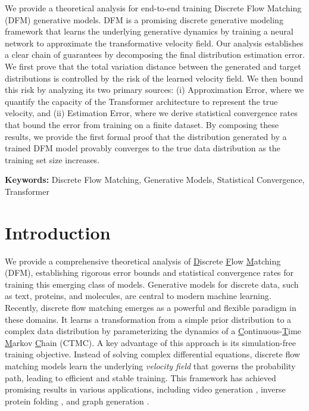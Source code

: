\documentclass[12pt]{article}
\numberwithin{equation}{section}
\let\cite\citep
\theoremstyle{theoremstyle}
\numberwithin{equation}{section}
\numberwithin{theorem}{section}
\numberwithin{proposition}{section}
\numberwithin{definition}{section}
\numberwithin{lemma}{section}
\numberwithin{assumption}{section}
\numberwithin{remark}{section}
\begin{document}
\begin{titlepage}
\noindent
We provide a theoretical analysis for end-to-end training Discrete Flow Matching (DFM) generative models. 
DFM is a promising discrete generative modeling framework that learns the underlying generative dynamics by training a neural network to approximate the transformative velocity field. 
Our analysis establishes a clear chain of guarantees by decomposing the final distribution estimation error.
We first prove that the total variation distance between the generated and target distributions is controlled by the risk of the learned velocity field. 
We then bound this risk by analyzing its two primary sources: (i) Approximation Error, where we quantify the capacity of the Transformer architecture to represent the true velocity, and (ii) Estimation Error, where we derive statistical convergence rates that bound the error from training on a finite dataset. 
By composing these results, we provide the first formal proof that the distribution generated by a trained DFM model provably converges to the true data distribution as the training set size increases. 

\vfill

\textbf{Keywords:}
Discrete Flow Matching, Generative Models, Statistical Convergence, Transformer




\end{titlepage}



{
\setlength{\parskip}{0em}
\setcounter{tocdepth}{2}
\tableofcontents
}
\setcounter{footnote}{0}


\section{Introduction}
\label{sec:intro}

We provide a comprehensive theoretical analysis of \underline{D}iscrete \underline{F}low \underline{M}atching (DFM), establishing rigorous error bounds and statistical convergence rates for training this emerging class of models.
Generative models for discrete data, such as text, proteins, and molecules, are central to modern machine learning. 
Recently, discrete flow matching \cite{campbell2024generative,gat2024discrete} emerges as a powerful and flexible paradigm in these domains. 
It learns a transformation from a simple prior distribution to a complex data distribution by parameterizing the dynamics of a \underline{C}ontinuous-\underline{T}ime \underline{M}arkov \underline{C}hain (CTMC). 
A key advantage of this approach is its simulation-free training objective. 
Instead of solving complex differential equations, discrete flow matching models learn the underlying \textit{velocity field} that governs the probability path, leading to efficient and stable training. 
This framework has achieved promising results in various applications, including video generation \cite{fuest2025maskflow}, inverse protein folding \cite{yi2025all}, and graph generation \cite{qin2024defog}.
\end{document}
